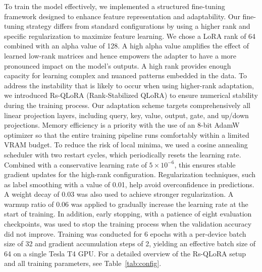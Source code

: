 \documentclass[utf8]{FrontiersinHarvard}
\begin{document}
To train the model effectively, we implemented a structured fine-tuning framework designed to enhance feature representation and adaptability. Our fine-tuning strategy differs from standard configurations by using a higher rank and specific regularization to maximize feature learning. We chose a LoRA rank of 64 combined with an alpha value of 128. A high alpha value amplifies the effect of learned low-rank matrices and hence empowers the adapter to have a more pronounced impact on the model's outputs. A high rank provides enough capacity for learning complex and nuanced patterns embedded in the data. To address the instability that is likely to occur when using higher-rank adaptation, we introduced Rs-QLoRA (Rank-Stabilized QLoRA) to ensure numerical stability during the training process. Our adaptation scheme targets comprehensively all linear projection layers, including query, key, value, output, gate, and up/down projections. Memory efficiency is a priority with the use of an 8-bit AdamW optimizer so that the entire training pipeline runs comfortably within a limited VRAM budget. To reduce the risk of local minima, we used a cosine annealing scheduler with two restart cycles, which periodically resets the learning rate. Combined with a conservative learning rate of $5 \times 10^{-6}$, this ensures stable gradient updates for the high-rank configuration. Regularization techniques, such as label smoothing with a value of 0.01, help avoid overconfidence in predictions. A weight decay of 0.03 was also used to achieve stronger regularization. A warmup ratio of 0.06 was applied to gradually increase the learning rate at the start of training. In addition, early stopping, with a patience of eight evaluation checkpoints, was used to stop the training process when the validation accuracy did not improve. Training was conducted for 6 epochs with a per-device batch size of 32 and gradient accumulation steps of 2, yielding an effective batch size of 64 on a single Tesla T4 GPU. For a detailed overview of the Rs-QLoRA setup and all training parameters, see Table~\ref{tab:config}.
\end{document}
